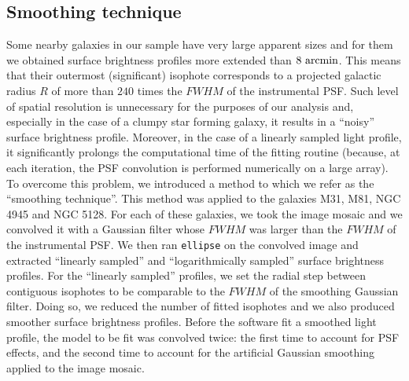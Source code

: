 \documentclass[preprint2]{emulateapj}
\begin{document}
\subsection{Smoothing technique}
\label{sec:smooth}
Some nearby galaxies in our sample have very large apparent sizes 
and for them we obtained surface brightness profiles more extended than $8~\rm arcmin$.
This means that their outermost (significant) isophote 
corresponds to a projected galactic radius $R$ 
of more than $240$ times the $FWHM$ of the instrumental PSF.
Such level of spatial resolution is unnecessary for the purposes of our analysis 
and, especially in the case of a clumpy star forming galaxy, 
it results in a ``noisy'' surface brightness profile.
Moreover, in the case of a linearly sampled light profile,
it significantly prolongs the computational time of the fitting routine 
(because, at each iteration, the PSF convolution is performed numerically on a large array).
To overcome this problem, we introduced a method to which we refer as the ``smoothing technique''.
This method was applied to the galaxies M31, M81, NGC 4945 and NGC 5128.
For each of these galaxies, we took the image mosaic and we convolved it with a Gaussian filter 
whose $FWHM$ was larger than the $FWHM$ of the instrumental PSF.
We then ran {\tt ellipse} on the convolved image and extracted 
``linearly sampled'' and ``logarithmically sampled'' surface brightness profiles. 
For the ``linearly sampled'' profiles, we set the radial step between contiguous isophotes to be 
comparable to the $FWHM$ of the smoothing Gaussian filter.
Doing so, we reduced the number of fitted isophotes and we also produced smoother surface brightness profiles.
Before the software fit a smoothed light profile, the model to be fit was convolved twice:
the first time to account for PSF effects, 
and the second time to account for the artificial Gaussian smoothing applied to the image mosaic.
\end{document}
